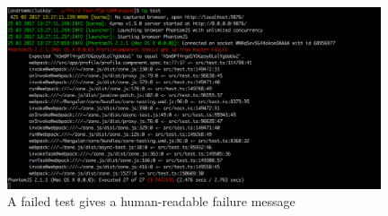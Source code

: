 \begin{figure}
\begin{center}
\includegraphics[width=11cm]{figures/testing_failed_test}
\end{center}
\caption{A failed test gives a human-readable failure message}
\label{fig:testing_failed_test}
\end{figure}